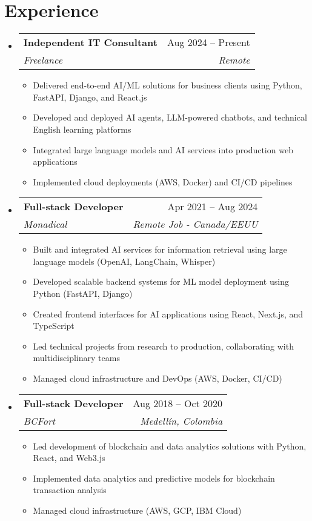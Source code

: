 \documentclass[letterpaper,11pt]{article}
\makeatletter
\newcommand{\resumeSubheading}[4]{
  \vspace{-2pt}
  \item[]
  \begin{tabular*}{\textwidth}{@{\extracolsep{\fill}}l r}
    \textbf{#1} & #2 \\
    \textit{#3} & \textit{#4} \\
  \end{tabular*}
  \vspace{-5pt}
}
\makeatother
\begin{document}
\section{Experience}
\begin{itemize}[leftmargin=0pt, itemindent=0pt, label={}]
\resumeSubheading
{Independent IT Consultant}{Aug 2024 -- Present}
{Freelance}{Remote}
\begin{itemize}[leftmargin=*]
    \item Delivered end-to-end AI/ML solutions for business clients using Python, FastAPI, Django, and React.js
    \item Developed and deployed AI agents, LLM-powered chatbots, and technical English learning platforms
    \item Integrated large language models and AI services into production web applications
    \item Implemented cloud deployments (AWS, Docker) and CI/CD pipelines
\end{itemize}

\resumeSubheading
{Full-stack Developer}{Apr 2021 -- Aug 2024}
{Monadical}{Remote Job - Canada/EEUU}
\begin{itemize}[leftmargin=*]
    \item Built and integrated AI services for information retrieval using large language models (OpenAI, LangChain, Whisper)
    \item Developed scalable backend systems for ML model deployment using Python (FastAPI, Django)
    \item Created frontend interfaces for AI applications using React, Next.js, and TypeScript
    \item Led technical projects from research to production, collaborating with multidisciplinary teams
    \item Managed cloud infrastructure and DevOps (AWS, Docker, CI/CD)
\end{itemize}

\resumeSubheading
{Full-stack Developer}{Aug 2018 -- Oct 2020}
{BCFort}{Medellín, Colombia}
\begin{itemize}[leftmargin=*]
    \item Led development of blockchain and data analytics solutions with Python, React, and Web3.js
    \item Implemented data analytics and predictive models for blockchain transaction analysis
    \item Managed cloud infrastructure (AWS, GCP, IBM Cloud)
\end{itemize}


\end{itemize}
\end{document}
